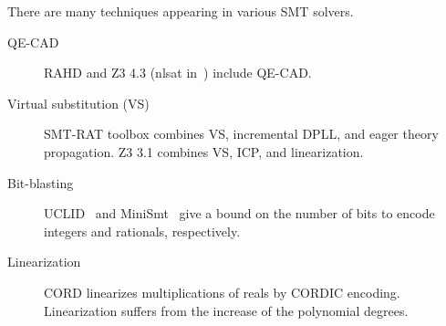 \documentclass[runningheads,a4paper,oribibl]{llncs}
\newcommand{\mizuhito}[1]{\{{\bf Mizuhito:~\sf #1}\}} %
\begin{document}
There are many techniques appearing in various SMT solvers. 
\begin{description}
\item[QE-CAD] RAHD \cite{Passmore09combineddecision} and 
Z3 4.3 (nlsat in~\cite{Jovanovic13}) include QE-CAD. 

\item[Virtual substitution (VS)]
SMT-RAT toolbox \cite{smtrat} combines 
VS, incremental DPLL, and %
eager theory propagation. 
Z3 3.1 %
combines VS, ICP, and linearization.

\item[Bit-blasting] %
UCLID~\cite{Bryant07decidingbit-vector} and MiniSmt~\cite{Zankl:2010:SNR:1939141.1939168} give a bound on the number of bits 
to encode integers and rationals, respectively. %

\item[Linearization] %
CORD \cite{cordic} %
linearizes multiplications of reals by CORDIC encoding. 
Linearization suffers from the increase of the polynomial degrees. 
\end{description}
\end{document}
